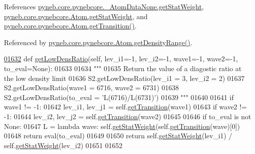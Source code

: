 References \hyperlink{pynebcore_8py_source_l00058}{pyneb.\+core.\+pynebcore.\+\_\+\+Atom\+Data\+None.\+get\+Stat\+Weight}, \hyperlink{pynebcore_8py_source_l01199}{pyneb.\+core.\+pynebcore.\+Atom.\+get\+Stat\+Weight}, and \hyperlink{pynebcore_8py_source_l01406}{pyneb.\+core.\+pynebcore.\+Atom.\+get\+Transition()}.



Referenced by \hyperlink{pynebcore_8py_source_l01676}{pyneb.\+core.\+pynebcore.\+Atom.\+get\+Density\+Range()}.


\begin{DoxyCode}
\hypertarget{classpyneb_1_1core_1_1pynebcore_1_1_atom_l01632}{}\hyperlink{classpyneb_1_1core_1_1pynebcore_1_1_atom_aa6db2a3425e5a35f0bd04f05bcb25ee1}{01632}     \textcolor{keyword}{def }\hyperlink{classpyneb_1_1core_1_1pynebcore_1_1_atom_aa6db2a3425e5a35f0bd04f05bcb25ee1}{getLowDensRatio}(self, lev\_i1=-1, lev\_i2=-1, wave1=-1, wave2=-1, to\_eval=None):
01633         
01634         \textcolor{stringliteral}{"""}
01635 \textcolor{stringliteral}{        Return the value of a diagostic ratio at the low density limit}
01636 \textcolor{stringliteral}{        S2.getLowDensRatio(lev\_i1 = 3, lev\_i2 = 2)}
01637 \textcolor{stringliteral}{        S2.getLowDensRatio(wave1 = 6716, wave2 = 6731)}
01638 \textcolor{stringliteral}{        S2.getLowDensRatio(to\_eval = 'L(6716)/L(6731)')}
01639 \textcolor{stringliteral}{        """}
01640         
01641         \textcolor{keywordflow}{if} wave1 != -1:
01642             lev\_i1, lev\_j1 = self.\hyperlink{classpyneb_1_1core_1_1pynebcore_1_1_atom_a7c9f17a3d9e841267add92377d9d1ede}{getTransition}(wave1)
01643         \textcolor{keywordflow}{if} wave2 != -1:
01644             lev\_i2, lev\_j2 = self.\hyperlink{classpyneb_1_1core_1_1pynebcore_1_1_atom_a7c9f17a3d9e841267add92377d9d1ede}{getTransition}(wave2)
01645             
01646         \textcolor{keywordflow}{if} to\_eval \textcolor{keywordflow}{is} \textcolor{keywordflow}{not} \textcolor{keywordtype}{None}:
01647             L = \textcolor{keyword}{lambda} wave: self.\hyperlink{classpyneb_1_1core_1_1pynebcore_1_1_atom_a0f2483487115f19556586b9e422bd5fb}{getStatWeight}(self.\hyperlink{classpyneb_1_1core_1_1pynebcore_1_1_atom_a7c9f17a3d9e841267add92377d9d1ede}{getTransition}(wave)[0])
01648             \textcolor{keywordflow}{return} eval(to\_eval)
01649             
01650         \textcolor{keywordflow}{return} self.\hyperlink{classpyneb_1_1core_1_1pynebcore_1_1_atom_a0f2483487115f19556586b9e422bd5fb}{getStatWeight}(lev\_i1) / self.\hyperlink{classpyneb_1_1core_1_1pynebcore_1_1_atom_a0f2483487115f19556586b9e422bd5fb}{getStatWeight}(lev\_i2)
01651         
01652         
\end{DoxyCode}
\hypertarget{classpyneb_1_1core_1_1pynebcore_1_1_atom_ae133eed382e284df01f2183da341534b}{}
